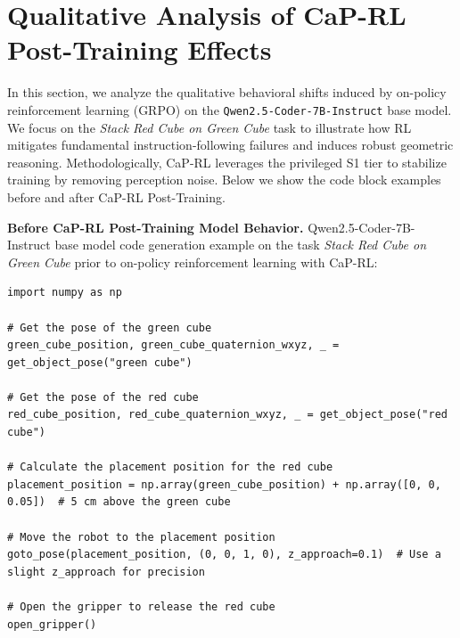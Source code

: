 \section{Qualitative Analysis of CaP-RL Post-Training Effects}\label{app:reinforcement_learning}
In this section, we analyze the qualitative behavioral shifts induced by on-policy reinforcement learning (GRPO) on the \texttt{Qwen2.5-Coder-7B-Instruct} base model. We focus on the \textit{Stack Red Cube on Green Cube} task to illustrate how RL mitigates fundamental instruction-following failures and induces robust geometric reasoning. Methodologically, CaP-RL leverages the privileged S1 tier to stabilize training by removing perception noise. Below we show the code block examples before and after CaP-RL Post-Training. 

\textbf{Before CaP-RL Post-Training Model Behavior.} Qwen2.5-Coder-7B-Instruct base model code generation example on the task \textit{Stack Red Cube on Green Cube} prior to on-policy reinforcement learning with CaP-RL:
\begin{lstlisting}
import numpy as np

# Get the pose of the green cube
green_cube_position, green_cube_quaternion_wxyz, _ = get_object_pose("green cube")

# Get the pose of the red cube
red_cube_position, red_cube_quaternion_wxyz, _ = get_object_pose("red cube")

# Calculate the placement position for the red cube
placement_position = np.array(green_cube_position) + np.array([0, 0, 0.05])  # 5 cm above the green cube

# Move the robot to the placement position
goto_pose(placement_position, (0, 0, 1, 0), z_approach=0.1)  # Use a slight z_approach for precision

# Open the gripper to release the red cube
open_gripper()
\end{lstlisting}

